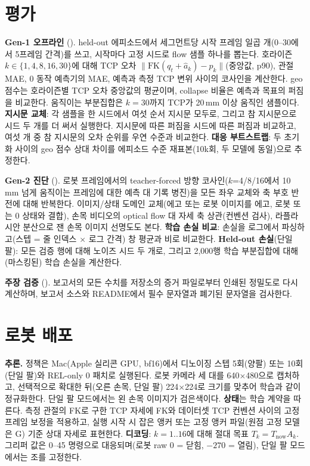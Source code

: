 \documentclass[conference,10pt]{IEEEtran}
\newcommand{\mm}{\,mm\xspace}
\begin{document}
\section{평가}\label{m:sec:eval}
\textbf{Gen-1 오프라인} (). held-out 에피소드에서 세그먼트당 시작 프레임 일곱 개(0--30에서 5프레임
간격)를 쓰고, 시작마다 고정 시드로 flow 샘플 하나를 뽑는다. 호라이즌 $k\in\{1,4,8,16,30\}$에 대해 TCP 오차
$\lVert\mathrm{FK}(q_t+\hat a_k)-p_k\rVert$(중앙값, p90), 관절 MAE, 0 동작 예측기의 MAE, 예측과 측정 TCP 변위 사이의 코사인을
계산한다. geo 점수는 호라이즌별 TCP 오차 중앙값의 평균이며, collapse 비율은 예측과 목표의 퍼짐을 비교한다. 움직이는 부분집합은
$k{=}30$까지 TCP가 20\mm{} 이상 움직인 샘플이다. \textbf{지시문 교체}: 각 샘플을 한 시드에서 여섯 순서 지시문 모두로, 그리고 참
지시문으로 시드 두 개를 더 써서 실행한다. 지시문에 따른 퍼짐을 시드에 따른 퍼짐과 비교하고, 여섯 개 중 참 지시문의 오차 순위를
우연 수준과 비교한다. \textbf{대응 부트스트랩}: 두 초기화 사이의 geo 점수 상대 차이를 에피소드 수준 재표본(10k회, 두 모델에 동일)으로
추정한다.

\textbf{Gen-2 진단} (). 로봇 프레임에서의 teacher-forced 방향 코사인($k$=4/8/16에서 10\mm{} 넘게 움직이는 프레임에
대한 예측 대 기록 병진)을 모든 좌우 교체와 축 부호 반전에 대해 반복한다. 이미지/상태 도메인 교체(에고 또는 로봇 이미지를 에고,
로봇 또는 0 상태와 결합), 손목 비디오의 optical flow 대 자세 축 상관(컨벤션 검사), 라플라시안 분산으로 잰 손목 이미지 선명도도
본다. \textbf{학습 손실 비교}: 손실을 로그에서 파싱하고(스텝 = 줄 인덱스 $\times$ 로그 간격) 창 평균과 비로 비교한다.
\textbf{Held-out 손실}(단일 팔): 모든 검증 행에 대해 노이즈 시드 두 개로, 그리고 2{,}000행 학습 부분집합에 대해 (마스킹된) 학습
손실을 계산한다.

\textbf{주장 검증} (). 보고서의 모든 수치를 저장소의 증거 파일로부터 인쇄된 정밀도로 다시 계산하며,
보고서 소스와 README에서 필수 문자열과 폐기된 문자열을 검사한다.

\section{로봇 배포}\label{m:sec:deploy}
\textbf{추론.} 정책은 Mac(Apple 실리콘 GPU, bf16)에서 디노이징 스텝 5회(양팔) 또는 10회(단일 팔)와 REL-only 0 패치로 실행된다. 로봇
카메라 세 대를 640$\times$480으로 캡처하고, 선택적으로 확대한 뒤(오른 손목, 단일 팔) 224$\times$224로 크기를 맞추어 학습과 같이
정규화한다. 단일 팔 모드에서는 왼 손목 이미지가 검은색이다. \textbf{상태}는 학습 계약을 따른다. 측정 관절의 FK로 구한 TCP 자세에
FK와 데이터셋 TCP 컨벤션 사이의 고정 프레임 보정을 적용하고, 실행 시작 시 잡은 앵커 또는 고정 앵커 파일(원점 고정 모델은 G) 기준
상대 자세로 표현한다. \textbf{디코딩}: $k=1..16$에 대해 절대 목표 $T_k=T_\text{now}A_k$. 그리퍼 값은 0--45 명령으로 대응되며(로봇
raw 0 = 닫힘, $-270$ = 열림), 단일 팔 모드에서는 조를 고정한다.
\end{document}
